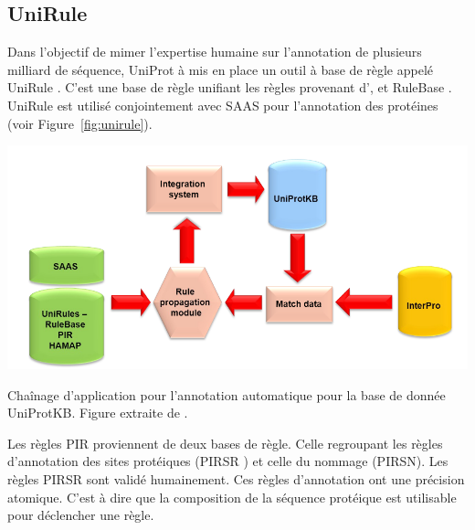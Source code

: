 \begin{refsegment}
    \subsection{UniRule}
    Dans l'objectif de mimer l'expertise humaine sur l'annotation de plusieurs milliard de séquence, UniProt à mis en place un outil à base de règle appelé UniRule \cite{unirule2015,bridge2010unirule}. C'est une base de règle unifiant les règles provenant d',  et RuleBase . UniRule est utilisé conjointement avec \acrfull{SAAS} \cite{kretschmann2001automatic,uniprot2015} pour l'annotation des protéines (voir Figure~\cref{fig:unirule}).
    
    \begin{shadedfigure}[H]
        \centering
        \includegraphics[width=\textwidth]{img/unirule.png}
        \caption{ Chaînage d'application pour l'annotation automatique pour la base de donnée UniProtKB. Figure extraite de . }
        \label{fig:unirule}
    \end{shadedfigure}

    Les règles \acrshort{PIR} proviennent de deux bases de règle.  Celle regroupant les règles d'annotation des sites protéiques (\acrfull{PIRSR} \cite{vasudevan2011structure}) et celle du nommage (\acrfull{PIRSN}). Les règles \acrfull{PIRSR} sont validé humainement. Ces règles d'annotation ont une précision atomique. C'est à dire que la composition de la séquence protéique est utilisable pour déclencher une règle.
    

\end{refsegment}
